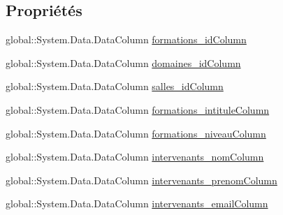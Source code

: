 \subsection*{Propriétés}
\begin{DoxyCompactItemize}
\item 
global\+::\+System.\+Data.\+Data\+Column \hyperlink{classforma_1_1formadb_data_set_1_1formations_data_table_a7864ba7cea6e5a91122695887cf8d2ee}{formations\+\_\+id\+Column}
\item 
global\+::\+System.\+Data.\+Data\+Column \hyperlink{classforma_1_1formadb_data_set_1_1formations_data_table_a4abe3209153d91d20bf7d2b402a1a6e8}{domaines\+\_\+id\+Column}
\item 
global\+::\+System.\+Data.\+Data\+Column \hyperlink{classforma_1_1formadb_data_set_1_1formations_data_table_ab6a423d5a9845fc27978a52b22d36700}{salles\+\_\+id\+Column}
\item 
global\+::\+System.\+Data.\+Data\+Column \hyperlink{classforma_1_1formadb_data_set_1_1formations_data_table_a141afa652a9e5fe07e7642792b0d5845}{formations\+\_\+intitule\+Column}
\item 
global\+::\+System.\+Data.\+Data\+Column \hyperlink{classforma_1_1formadb_data_set_1_1formations_data_table_a7d80e78b36adab310c7cbfaece923599}{formations\+\_\+niveau\+Column}
\item 
global\+::\+System.\+Data.\+Data\+Column \hyperlink{classforma_1_1formadb_data_set_1_1formations_data_table_a7c0ab531e9a6d1371ddf79445f2d835e}{intervenants\+\_\+nom\+Column}
\item 
global\+::\+System.\+Data.\+Data\+Column \hyperlink{classforma_1_1formadb_data_set_1_1formations_data_table_affbd27399c731dc96904687bed01919f}{intervenants\+\_\+prenom\+Column}
\item 
global\+::\+System.\+Data.\+Data\+Column \hyperlink{classforma_1_1formadb_data_set_1_1formations_data_table_a4c6361f3df85e8fc81eac3ebf037b030}{intervenants\+\_\+email\+Column}

\end{DoxyCompactItemize}
